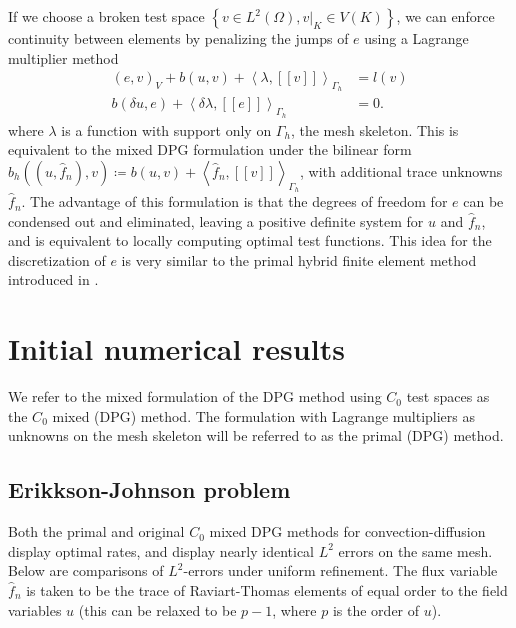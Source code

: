 \documentclass[final,leqno]{siamltex}
\newcommand{\LRp}[1]{\left( #1 \right)}
\newcommand{\LRs}[1]{\left[ #1 \right]}
\newcommand{\LRa}[1]{\left\langle #1 \right\rangle}
\newcommand{\LRc}[1]{\left\{ #1 \right\}}
\newcommand{\jump}[1] {\ensuremath{\LRs{\!\left[#1\right]\!}}}
\newcommand{\fnh}{\widehat{f}_n}
\renewcommand{\L}{L^2\LRp{\Omega}}
\newcommand{\Gh}{\Gamma_h}
\begin{document}
If we choose a broken test space $\LRc{ v\in \L, \left.v\right|_K \in V(K)}$, we can enforce continuity between elements by penalizing the jumps of $e$ using a Lagrange multiplier method 
\begin{align*}
(e,v)_V + b(u,v) + \LRa{\lambda, \jump{v}}_{\Gh}&= l(v)\\
b(\delta u,e) + \LRa{\delta \lambda, \jump{e}}_{\Gh} &= 0.
\end{align*}
where $\lambda$ is a function with support only on $\Gh$, the mesh skeleton.  This is equivalent to the mixed DPG formulation under the bilinear form $b_h((u,\fnh),v) \coloneqq b(u,v) + \LRa{\fnh, \jump{v}}_{\Gh}$, with additional trace unknowns $\fnh$.  The advantage of this formulation is that the degrees of freedom for $e$ can be condensed out and eliminated, leaving a positive definite system for $u$ and $\fnh$, and is equivalent to locally computing optimal test functions.  This idea for the discretization of $e$ is very similar to the primal hybrid finite element method introduced in \cite{raviart1977primal}.  

\section{Initial numerical results}

We refer to the mixed formulation of the DPG method using $C_0$ test spaces as the $C_0$ mixed (DPG) method.  The formulation with Lagrange multipliers as unknowns on the mesh skeleton will be referred to as the primal (DPG) method.  

\subsection{Erikkson-Johnson problem}
Both the primal and original $C_0$ mixed DPG methods for convection-diffusion display optimal rates, and display nearly identical $L^2$ errors on the same mesh.  Below are comparisons of $L^2$-errors under uniform refinement.  The flux variable $\fnh$ is taken to be the trace of Raviart-Thomas elements of equal order to the field variables $u$ (this can be relaxed to be $p-1$, where $p$ is the order of $u$).  
\end{document}
